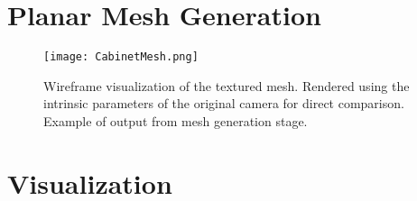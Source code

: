 \section{Planar Mesh Generation}
\begin{figure}[ht]
    \centering
    \texttt{[image: CabinetMesh.png]}
    \caption{Wireframe visualization of the textured mesh. Rendered using the intrinsic parameters of the original camera for direct comparison. Example of output from mesh generation stage.}
    \label{fig:meshoutput}
\end{figure}


\section{Visualization}
